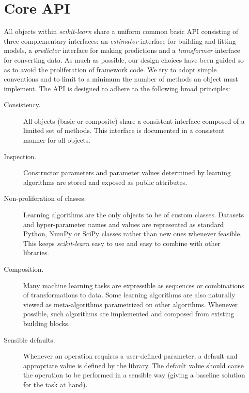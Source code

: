 \documentclass{llncs}
\newcommand{\sklearn}{\textit{scikit-learn}\xspace}
\begin{document}
\section{Core API}

\label{sec:core-api}

All objects within \sklearn share a uniform common basic API consisting of three
complementary interfaces: an \textit{estimator} interface for building and
fitting models, a \textit{predictor} interface for making predictions and a
\textit{transformer} interface for converting data. As much as possible, our
design choices have been guided so as to avoid the proliferation of framework
code. We try to adopt simple conventions and to limit to a minimum the number of
methods an object must implement. The API is designed to adhere to the following
broad principles:

\begin{description}
  \item[Consistency.]
       All objects (basic or composite) share a consistent interface composed of
       a limited set of methods. This interface is documented in a consistent
       manner for all objects.
  \item[Inspection.]
       Constructor parameters and parameter values determined by learning
       algorithms are stored and exposed as public attributes.
  \item[Non-proliferation of classes.]
       Learning algorithms are the only objects to be of custom classes.
       Datasets and hyper-parameter names and values are represented as standard
       Python, NumPy or SciPy classes rather than new ones whenever feasible.
       This keeps \sklearn easy to use and easy to combine with other libraries.
  \item[Composition.]
       Many machine learning tasks are expressible
       as sequences or combinations of transformations to data.
       Some learning algorithms are also naturally viewed
       as meta-algorithms parametrized on other algorithms.
       Whenever possible, such algorithms are implemented and composed from
       existing building blocks.
  \item[Sensible defaults.]
       Whenever an operation requires a user-defined parameter,
       a default and appropriate value is defined by the library.
       The default value should cause the operation to be performed
       in a sensible way (giving a baseline solution for the task at hand).
\end{description}
\end{document}
